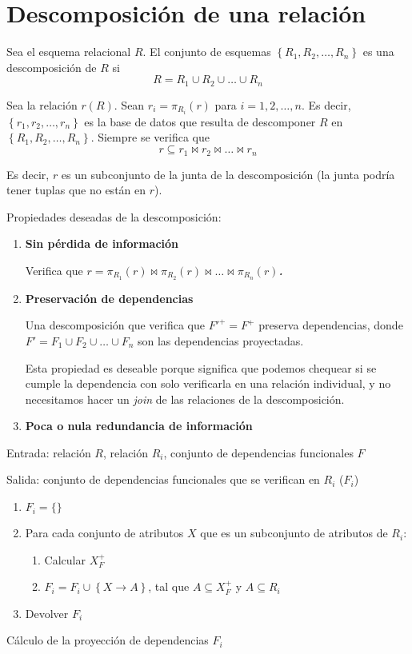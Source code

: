 \documentclass[a4paper, twoside]{article}
\begin{document}
\section{Descomposición de una relación}
Sea el esquema relacional $R$. El conjunto de esquemas $\left\{ R_{1},R_{2},\dots,R_{n}\right\}$ es una descomposición de $R$ si
\[
	R = R_{1}\cup R_{2}\cup\dots\cup R_{n}
\]

Sea la relación $r(R)$. Sean $r_{i}=\pi_{R_{i}}(r)$ para $i=1,2,\dots,n$. Es decir, $\left\{ r_{1},r_{2},\dots,r_{n}\right\} $ es la base de datos que resulta de descomponer $R$ en $\left\{ R_{1},R_{2},\dots,R_{n}\right\} $. Siempre se verifica que
\[
	r\subseteq r_{1}\bowtie r_{2}\bowtie\dots\bowtie r_{n}
\]

Es decir, $r$ es un subconjunto de la junta de la descomposición (la junta podría tener tuplas que no están en $r$).

Propiedades deseadas de la descomposición:
\begin{enumerate}
	\item \textbf{Sin pérdida de información}
	
	Verifica que \textbf{\emph{$r=\pi_{R_{1}}(r)\bowtie\pi_{R_{2}}(r)\bowtie\dots\bowtie\pi_{R_{n}}(r)$.}}

	\item \textbf{Preservación de dependencias}

	Una descomposición que verifica que $F'^{+}=F^{+}$ preserva dependencias, donde $F' = F_{1} \cup F_{2} \cup \dots \cup F_{n}$ son las dependencias proyectadas.

	Esta propiedad es deseable porque significa que podemos chequear si se cumple la dependencia con solo verificarla en una relación individual, y no necesitamos hacer un \emph{join} de las relaciones de la descomposición.

	\item \textbf{Poca o nula redundancia de información}
\end{enumerate}

\begin{algorithm}[H]
	Entrada: relación $R$, relación $R_{i}$, conjunto de dependencias funcionales $F$

	Salida: conjunto de dependencias funcionales que se verifican en $R_{i}$ ($F_{i}$)
	\begin{enumerate}
		\item $F_{i}=\{\}$
		\item Para cada conjunto de atributos $X$ que es un subconjunto de atributos de $R_{i}$:
		\begin{enumerate}
			\item Calcular $X_{F}^{+}$
			\item $F_{i}=F_{i}\cup\left\{ X\to A\right\} $, tal que $A\subseteq X_{F}^{+}$ y $A\subseteq R_{i}$
		\end{enumerate}
		\item Devolver $F_{i}$
	\end{enumerate}
	\caption{Cálculo de la proyección de dependencias $F_{i}$}
\end{algorithm}
\end{document}
